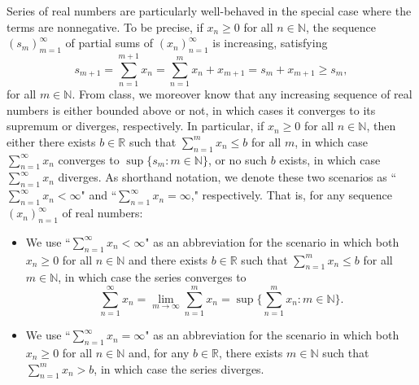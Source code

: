 \documentclass[12 pt,letterpaper]{article}
\newcommand{\bbN}{\mathbb{N}}
\newcommand{\bbR}{\mathbb{R}}
\newcommand{\set}[1]{\{{#1}\}}
\newcommand{\biggset}[1]{\biggl\{{#1}\biggr\}}
\begin{document}
\newpage

\noindent
Series of real numbers are particularly well-behaved in the special case where the terms are nonnegative.
To be precise, if $x_n\geq0$ for all $n\in\bbN$,
the sequence $(s_m)_{m=1}^{\infty}$ of partial sums of $(x_n)_{n=1}^{\infty}$ is increasing,
satisfying
\begin{equation*}
s_{m+1}
=\sum_{n=1}^{m+1}x_n
=\sum_{n=1}^{m}x_n+x_{m+1}
=s_m+x_{m+1}
\geq s_m,
\end{equation*}
for all $m\in\bbN$.
From class,
we moreover know that any increasing sequence of real numbers is either bounded above or not, in which cases it converges to its supremum or diverges, respectively.
In particular,
if $x_n\geq0$ for all $n\in\bbN$,
then either there exists $b\in\bbR$ such that $\sum_{n=1}^{m}x_n\leq b$ for all $m$,
in which case $\sum_{n=1}^{\infty}x_n$ converges to $\sup\set{s_m: m\in\bbN}$,
or no such $b$ exists, in which case $\sum_{n=1}^{\infty}x_n$ diverges.
As shorthand notation,
we denote these two scenarios as ``$\sum_{n=1}^{\infty}x_n<\infty$" and ``$\sum_{n=1}^{\infty}x_n=\infty$," respectively.
That is, for any sequence $(x_n)_{n=1}^\infty$ of real numbers:
\begin{itemize}

\item
We use ``$\sum_{n=1}^{\infty}x_n<\infty$" as an abbreviation for the scenario in which both $x_n\geq0$ for all $n\in\bbN$ and there exists $b\in\bbR$ such that $\sum_{n=1}^{m}x_n\leq b$ for all $m\in\bbN$, in which case the series converges to
\begin{equation*}
\sum_{n=1}^{\infty}x_n
=\lim_{m\rightarrow\infty}\sum_{n=1}^m x_n
=\sup\biggset{\sum_{n=1}^{m}x_n : m\in\bbN}.
\end{equation*}

\item
We use ``$\sum_{n=1}^{\infty}x_n=\infty$" as an abbreviation for the scenario in which both $x_n\geq0$ for all $n\in\bbN$ and, for any $b\in\bbR$,
there exists $m\in\bbN$ such that $\sum_{n=1}^{m}x_n> b$, in which case the series diverges.

\end{itemize}
\end{document}
